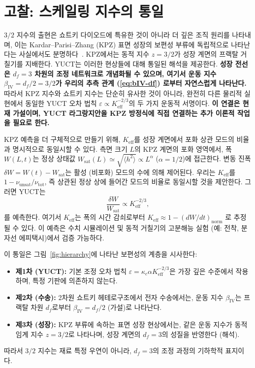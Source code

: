 \documentclass[12pt,a4paper]{article}
\newcommand{\Keff}{K_{\mathrm{eff}}}
\theoremstyle{remark}
\begin{document}
	\section{고찰: 스케일링 지수의 통일}
	
	$3/2$ 지수의 출현은 쇼트키 다이오드에 특유한 것이 아니라 더 깊은 조직 원리를
	나타내며, 이는 Kardar–Parisi–Zhang (KPZ) 표면 성장의 보편성 부류에
	독립적으로 나타난다는 사실에서도 분명하다~\cite{KPZ}. KPZ에서는 동적 지수 $z = 3/2$가
	성장 계면의 프랙탈 거칠기를 지배한다. YUCT는 이러한 현상들에 대해 통일된 해석을 제공한다.
	\textbf{성장 전선은 $d_f = 3$ 차원의 조정 네트워크로 개념화될 수 있으며,
		여기서 운동 지수 $\beta_{\mathrm{IV}} = d_f/2 = 3/2$가 우리의 추측 관계 (\ref{eq:bIV-df})
		로부터 자연스럽게 나타난다.} 따라서 KPZ 지수와 쇼트키 지수는 단순히 유사한 것이 아니라,
	완전히 다른 물리적 실현에서 동일한 YUCT 오차 법칙 $\varepsilon \propto \Keff^{-2/3}$의
	두 가지 운동적 서명이다. \textbf{이 연결은 현재 가설이며, YUCT 라그랑지안을 KPZ 방정식에
		직접 연결하는 추가 이론적 작업을 필요로 한다.}
	
	KPZ 예측을 더 구체적으로 만들기 위해, $\Keff$를 성장 계면에서 포화 상관 모드의
	비율과 명시적으로 동일시할 수 있다. 측면 크기 $L$의 KPZ 계면의 포화 영역에서,
	폭 $W(L,t)$는 정상 상태값 $W_{\text{sat}}(L) \simeq \sqrt{\langle h^2 \rangle} \propto L^{\alpha}$
	($\alpha = 1/2$)에 접근한다. 변동 진폭 $\delta W = W(t) - W_{\text{sat}}$는
	활성 (비포화) 모드의 수에 의해 제어된다. 우리는 $\Keff$를
	$1 - \nu_{\text{unsat}}/\nu_{\text{tot}}$, 즉 상관된 정상 상에 들어간 모드의 비율로
	동일시할 것을 제안한다. 그러면 YUCT는
	\begin{equation}
		\frac{\delta W}{W_{\text{sat}}} \propto \Keff^{-2/3},
		\label{eq:kpz-prediction}
	\end{equation}
	를 예측한다. 여기서 $\Keff$는 폭의 시간 감쇠로부터 $\Keff \approx 1 - (dW/dt)_{\text{norm}}$
	로 추정될 수 있다. 이 예측은 수치 시뮬레이션 및 동적 거칠기의 고분해능 실험
	(예: 전착, 분자선 에피택시)에서 검증 가능하다.
	
	이 통일은 그림~\ref{fig:hierarchy}에 나타난 보편성의 계층을 시사한다:
	\begin{itemize}
		\item \textbf{제1차 (YUCT):} 기본 조정 오차 법칙
		$\varepsilon = \kappa_c \alpha K_{\mathrm{eff}}^{-2/3}$은 가장 깊은 수준에서
		작용하며, 특정 기판에 의존하지 않는다.
		\item \textbf{제2차 (수송):} 2차원 쇼트키 헤테로구조에서 전자 수송에서는,
		운동 지수 $\beta_{\mathrm{IV}}$는 프랙탈 차원 $d_f$로부터
		$\beta_{\mathrm{IV}} = d_f/2$ (가설)로 나타난다.
		\item \textbf{제3차 (성장):} KPZ 부류에 속하는 표면 성장 현상에서는,
		같은 운동 지수가 동적 임계 지수 $z = 3/2$로 나타나며, 성장 계면의 $d_f = 3$의
		성질을 반영한다 (해석).
	\end{itemize}
	따라서 $3/2$ 지수는 재료 특정 우연이 아니라, $d_f = 3$의 조정 과정의
	기하학적 표지이다.
	
\end{document}
